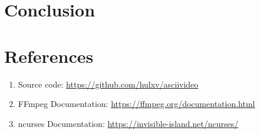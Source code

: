 \documentclass[a4paper,12pt]{article}
\begin{document}
\section{Conclusion}

\section*{References}
\begin{enumerate}
    \item Source code: \url{https://github.com/hulxv/asciivideo}
    \item FFmpeg Documentation: \url{https://ffmpeg.org/documentation.html}
    \item ncurses Documentation: \url{https://invisible-island.net/ncurses/}
\end{enumerate}
\end{document}
